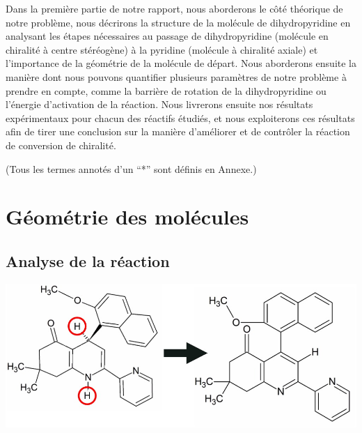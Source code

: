\documentclass{article}
\begin{document}
Dans la première partie de notre rapport, nous aborderons le côté théorique de notre problème, nous décrirons la structure de la molécule de dihydropyridine en analysant les étapes nécessaires au passage de dihydropyridine (molécule en chiralité à centre stéréogène) à la pyridine (molécule à chiralité axiale) et l’importance de la géométrie de la molécule de départ. Nous aborderons ensuite la manière dont nous pouvons quantifier plusieurs paramètres de notre problème à prendre en compte, comme la barrière de rotation de la dihydropyridine ou l'énergie d’activation de la réaction. Nous livrerons ensuite nos résultats expérimentaux pour chacun des réactifs étudiés, et nous exploiterons ces résultats afin de tirer une conclusion sur la manière d’améliorer et de contrôler la réaction de conversion de chiralité.

\newpage

\tableofcontents
\bigbreak
\bigbreak
\bigbreak
(Tous les termes annotés d’un “*” sont définis en Annexe.)

\newpage
\section{Géométrie des molécules}

\medbreak
\par
\subsection{Analyse de la réaction}


\begin{center}
\includegraphics[scale = 0.3]{a}
\end{center}
\end{document}
